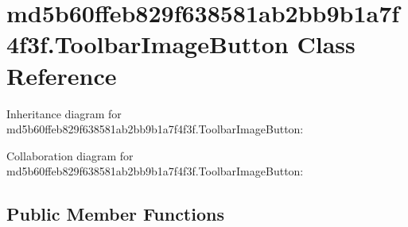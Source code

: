 \hypertarget{classmd5b60ffeb829f638581ab2bb9b1a7f4f3f_1_1_toolbar_image_button}{}\section{md5b60ffeb829f638581ab2bb9b1a7f4f3f.\+Toolbar\+Image\+Button Class Reference}
\label{classmd5b60ffeb829f638581ab2bb9b1a7f4f3f_1_1_toolbar_image_button}


Inheritance diagram for md5b60ffeb829f638581ab2bb9b1a7f4f3f.\+Toolbar\+Image\+Button\+:


Collaboration diagram for md5b60ffeb829f638581ab2bb9b1a7f4f3f.\+Toolbar\+Image\+Button\+:
\subsection*{Public Member Functions}

